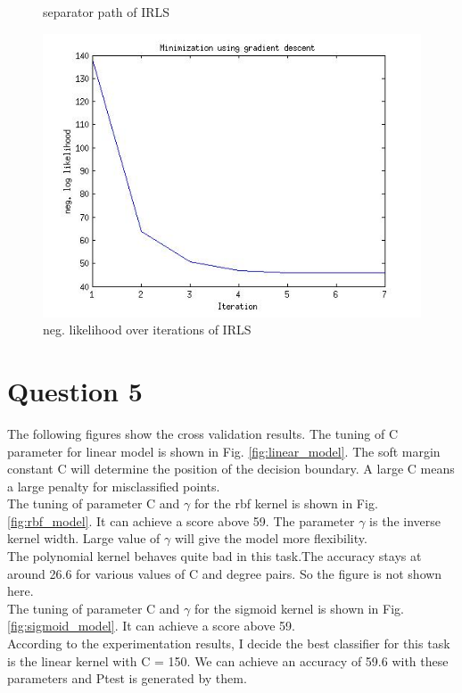 \documentclass[paper=a4, fontsize=15pt]{article} %
\begin{document}
\begin{enumerate}
\begin{figure}[hb]
\caption{separator path of IRLS}
\label{fig:irls2}
\end{figure}
\begin{figure}[hb]
\includegraphics[width=\linewidth]{./a2_datacode/lr/fig3_irls.jpg}
\caption{neg. likelihood over iterations of IRLS}
\label{fig:irls3}
\end{figure}
\end{enumerate}
\section*{Question 5}
The following figures show the cross validation results.
The tuning of C parameter for linear model is shown in Fig. \ref{fig:linear_model}.
The soft margin constant C will determine the position of the decision boundary. A large C means a large penalty for misclassified points.\\
The tuning of parameter C and $\gamma$ for the rbf kernel is shown in Fig. \ref{fig:rbf_model}. It can achieve a score above 59.
The parameter $\gamma$ is the inverse kernel width. Large value of $\gamma$ will give the model more flexibility.\\
The polynomial kernel behaves quite bad in this task.The accuracy stays at around 26.6 for various values of C and degree pairs. So the figure is not shown here.\\
The tuning of parameter C and $\gamma$ for the sigmoid kernel is shown in Fig. \ref{fig:sigmoid_model}.
It can achieve a score above 59. \\
According to the experimentation results, I decide the best classifier for this task is the linear kernel with C = 150. We can achieve an accuracy of 59.6 with these parameters and Ptest is generated by them.
\end{document}
